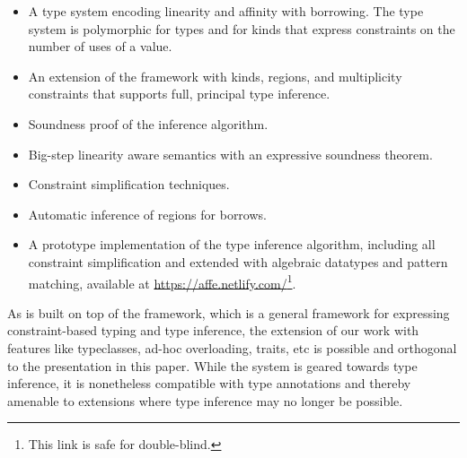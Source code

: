 \begin{itemize}
\item A type system encoding linearity and affinity with
  borrowing. The type system is polymorphic for types and
  for kinds that express constraints on the number of uses of a value.
\item An extension of the \hmx framework
  \cite{DBLP:journals/tapos/OderskySW99} with kinds, regions, and
  multiplicity constraints that supports full, principal type inference.
\item Soundness proof of the inference algorithm.
\item Big-step linearity aware semantics with an expressive soundness theorem.
\item Constraint simplification techniques.
\item Automatic inference of regions for borrows.
\item A prototype implementation of the type inference algorithm, including all
  constraint simplification and extended with algebraic datatypes and
  pattern matching,
  available at \url{https://affe.netlify.com/}\footnote{This link is safe for double-blind.}.
\end{itemize}

As \lang{} is built on top of the \hmx{} framework, which is a general
framework for expressing constraint-based typing and type inference,
the extension of our work with features like typeclasses, ad-hoc overloading,
traits, etc is possible and orthogonal to the presentation in this paper. 
While the system is geared towards type inference, it is nonetheless
compatible with type annotations and thereby amenable to extensions
where type inference may no longer be possible.

